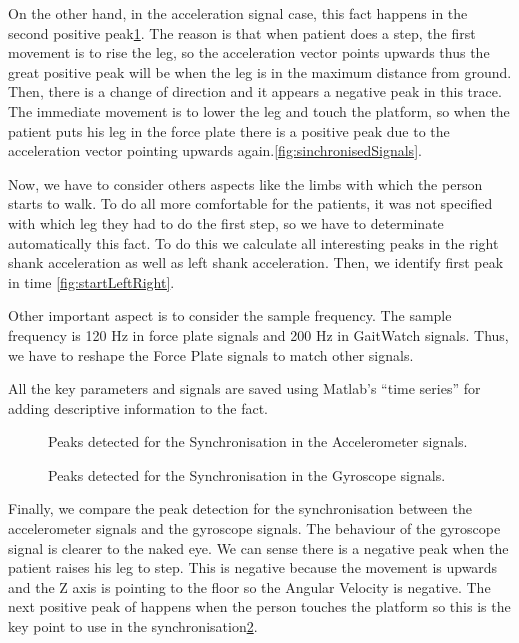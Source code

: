 On the other hand, in the acceleration signal case, this fact happens in the second positive peak\ref{fig:pointdetectionAcc}. The reason is that when patient does a step, the first movement is to rise the leg, so the acceleration vector points upwards thus the great positive peak will be when the leg is in the maximum distance from ground. Then, there is a change of direction and it appears a negative peak in this trace. The immediate movement is to lower the leg and touch the platform, so when the patient puts his leg in the force plate there is a positive peak due to the acceleration vector pointing upwards again.\ref{fig:sinchronisedSignals}.

Now, we have to consider others aspects like the limbs with which the person starts to walk. To do all more comfortable for the patients, it was not specified with which leg they had to do the first step, so we have to determinate automatically this fact. To do this we calculate all interesting peaks in the right shank acceleration as well as left shank acceleration. Then, we identify first peak in time \ref{fig:startLeftRight}.

Other important aspect is to consider the sample frequency. The sample frequency is 120 Hz in force plate signals and 200 Hz in GaitWatch signals. Thus, we have to reshape the Force Plate signals to match other signals.

All the key parameters and signals are saved using Matlab's “time series” for adding descriptive information to the fact.

\begin{figure}[H]
	\centering
	\caption{Peaks detected for the Synchronisation in the Accelerometer signals.}
	\label{fig:pointdetectionAcc}
\end{figure}

\begin{figure}[H]
	\centering
	\caption{Peaks detected for the Synchronisation in the Gyroscope signals.}
	\label{fig:pointdetectionGyro}
\end{figure}

Finally, we compare the peak detection for the synchronisation between the accelerometer signals and the gyroscope signals. The behaviour of the gyroscope signal is clearer to the naked eye. We can sense there is a negative peak when the patient raises his leg to step. This is negative because the movement is upwards and the Z axis is pointing to the floor so the Angular Velocity is negative. The next positive peak of happens when the person touches the platform so this is the key point to use in the synchronisation\ref{fig:pointdetectionGyro}.

